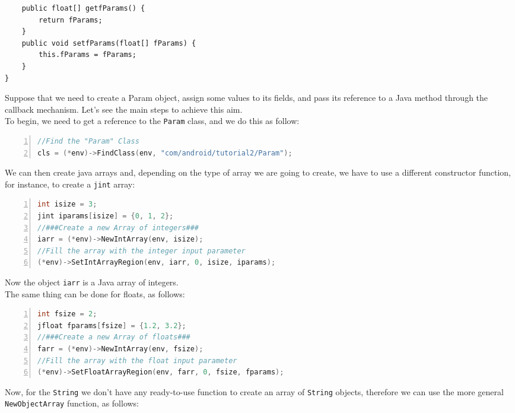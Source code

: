 \documentclass[a4paper,10pt]{article}
\newcommand{\keyword}[1]{\texttt{#1}}
\begin{document}
\begin{multicols}{2}
\begin{lstlisting}
	public float[] getfParams() {
		return fParams;
	}
	public void setfParams(float[] fParams) {
		this.fParams = fParams;
	}
}
\end{lstlisting}
Suppose that we need to create a Param object, assign some values to its fields,
and pass its reference to a Java method through the callback mechanism. Let's
see the main steps to achieve this aim.\\
To begin, we need to get a reference to the \keyword{Param} class, and we do
this as follow:
\begin{lstlisting}[language=C,
		   columns=fullflexible,
		   showstringspaces=false,
		   xleftmargin=15pt,
		   frame = l,
		   numbers=left,
		   commentstyle=\color{gray}\upshape]
//Find the "Param" Class
cls = (*env)->FindClass(env, "com/android/tutorial2/Param");
\end{lstlisting}
We can then create java arrays and, depending on the type of array we are going
to create, we have to use a different constructor function, for instance, to
create a \keyword{jint} array:
\begin{lstlisting}[language=C,
		   columns=fullflexible,
		   showstringspaces=false,
		   xleftmargin=15pt,
		   frame = l,
		   numbers=left,
		   commentstyle=\color{gray}\upshape]
int isize = 3;
jint iparams[isize] = {0, 1, 2};
//###Create a new Array of integers###
iarr = (*env)->NewIntArray(env, isize);
//Fill the array with the integer input parameter
(*env)->SetIntArrayRegion(env, iarr, 0, isize, iparams);
\end{lstlisting}
Now the object \keyword{iarr} is a Java array of integers.\\
The same thing can be done for floats, as follows:
\begin{lstlisting}[language=C,
		   columns=fullflexible,
		   showstringspaces=false,
		   xleftmargin=15pt,
		   frame = l,
		   numbers=left,
		   commentstyle=\color{gray}\upshape]
int fsize = 2;
jfloat fparams[fsize] = {1.2, 3.2};
//###Create a new Array of floats###
farr = (*env)->NewIntArray(env, fsize);
//Fill the array with the float input parameter
(*env)->SetFloatArrayRegion(env, farr, 0, fsize, fparams);
\end{lstlisting}
Now, for the \keyword{String} we don't have any ready-to-use function to create
an array of \keyword{String} objects, therefore we can use the more general
\keyword{NewObjectArray} function, as follows:
\begin{lstlisting}[language=C,
		   columns=fullflexible,
		   showstringspaces=false,
		   xleftmargin=15pt,
		   frame = l,
		   numbers=left,
		   commentstyle=\color{gray}\upshape]

\end{lstlisting}
\end{multicols}
\end{document}
